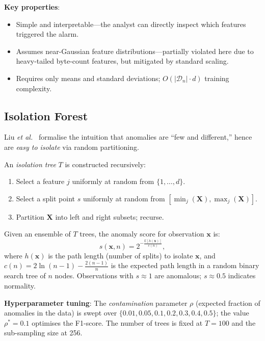 \documentclass[conference]{IEEEtran}
\begin{document}
\textbf{Key properties}:
\begin{itemize}
  \item Simple and interpretable---the analyst can directly inspect which features
        triggered the alarm.
  \item Assumes near-Gaussian feature distributions---partially violated here due
        to heavy-tailed byte-count features, but mitigated by standard scaling.
  \item Requires only means and standard deviations; $O(|\mathcal{D}_n| \cdot d)$
        training complexity.
\end{itemize}

\subsection{Isolation Forest}
\label{ssec:iforest}

Liu \emph{et al.}\ \cite{liu2008} formalise the intuition that anomalies are ``few
and different,'' hence are \emph{easy to isolate} via random partitioning.

An \emph{isolation tree} $T$ is constructed recursively:
\begin{enumerate}
  \item Select a feature $j$ uniformly at random from $\{1,\ldots,d\}$.
  \item Select a split point $s$ uniformly at random from
        $[\min_j(\mathbf{X}), \max_j(\mathbf{X})]$.
  \item Partition $\mathbf{X}$ into left and right subsets; recurse.
\end{enumerate}

Given an ensemble of $T$ trees, the anomaly score for observation $\mathbf{x}$ is:
\begin{equation}
  s(\mathbf{x}, n) = 2^{-\frac{\mathbb{E}[h(\mathbf{x})]}{c(n)}},
\end{equation}
where $h(\mathbf{x})$ is the path length (number of splits) to isolate $\mathbf{x}$,
and $c(n) = 2 \ln(n-1) - \frac{2(n-1)}{n}$ is the expected path length in a random
binary search tree of $n$ nodes.  Observations with $s \approx 1$ are anomalous;
$s \approx 0.5$ indicates normality.

\textbf{Hyperparameter tuning}: The \emph{contamination} parameter $\rho$
(expected fraction of anomalies in the data) is swept over $\{0.01, 0.05, 0.1, 0.2, 0.3, 0.4, 0.5\}$;
the value $\rho^{*} = 0.1$ optimises the F1-score.  The number of trees is fixed at
$T=100$ and the sub-sampling size at 256.
\end{document}
